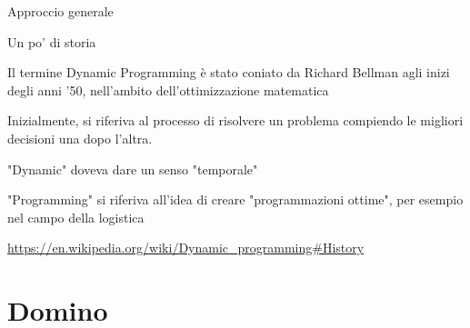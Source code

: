 %
%
%
%
%


\begin{frame}{Approccio generale}

\vspace{-9pt}

\end{frame}

\begin{frame}{Un po' di storia}

\BIL
\item Il termine \alert{Dynamic Programming} è stato coniato da Richard Bellman 
agli inizi degli anni '50, nell'ambito dell'ottimizzazione matematica   
\item Inizialmente, si riferiva al processo di risolvere un problema compiendo
le migliori decisioni una dopo l'altra.
\item "Dynamic" doveva dare un senso "temporale"
\item "Programming" si riferiva all'idea di creare "programmazioni ottime",
per esempio nel campo della logistica
\EIL

\bigskip
\url{https://en.wikipedia.org/wiki/Dynamic_programming\#History}

\end{frame}



\section{Domino}

